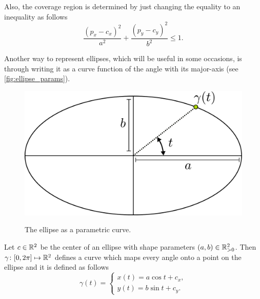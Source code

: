 Also, the coverage region is determined by just changing the equality to an inequality as follows
\begin{equation}\label{equation:cover_pellipse}
\frac{(p_x-c_x)^2}{a^2} + \frac{(p_y-c_y)^2}{b^2} \le 1.
\end{equation}

Another way to represent ellipses, which will be useful in some occasions, is through writing it as a curve function of the angle with its major-axis (see \autoref{fig:ellipse_params}).

\begin{figure}[H]
    \centering
    
    \caption{The ellipse as a parametric curve.}
%    
   	\includegraphics[scale=.36]{tex/figures/ellipse_definition.pdf}
    \fautor
    \label{fig:ellipse_params}
\end{figure}

Let $c \in \mathbb{R}^2$ be the center of an ellipse with shape parameters $(a,b) \in \mathbb{R}^2_{>0}$. Then $\gamma\colon[0, 2\pi]\mapsto\mathbb{R}^2$ defines a curve which maps every angle onto a point on the ellipse and it is defined as follows
\begin{equation}\label{eq:parametric_ellipse}
\gamma(t) = \left\{
\begin{array}{l}
x(t)= a\cos{t} + c_x,\\
y(t)=b\sin{t} + c_y.
\end{array}
\right.
\end{equation}

